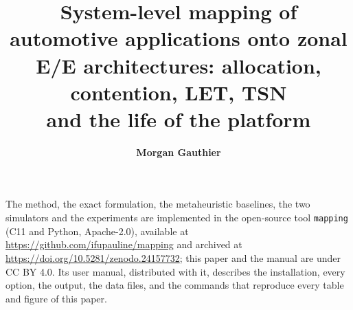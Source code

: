 \documentclass[10pt,a4paper,twocolumn]{article}
\title{System-level mapping of automotive applications onto zonal\\
	E/E architectures: allocation, contention, LET, TSN\\
	and the life of the platform}
\author{\textbf{Morgan Gauthier}}
\date{}
\renewcommand{\paragraph}[1]{\par\smallskip\noindent{\sffamily\bfseries
	\small\color{brand}#1}\hspace{0.5em}}
\theoremstyle{paper}
\theoremstyle{paperremark}
\begin{document}
\twocolumn[{%
\maketitle
\thispagestyle{first}
\begin{tcolorbox}[enhanced,colback=brandlight,colframe=brandlight,arc=1pt,
	boxrule=0pt,left=9pt,right=9pt,top=6pt,bottom=6pt]
\small

\end{tcolorbox}
\vspace{10pt}
}]















\paragraph{Availability.} The method, the exact formulation, the
metaheuristic baselines, the two simulators and the experiments are
implemented in the open-source tool \texttt{mapping} (C11 and Python,
Apache-2.0), available at \url{https://github.com/ifupauline/mapping}
and archived at \url{https://doi.org/10.5281/zenodo.24157732};
this paper and the manual are under CC BY 4.0. Its user manual,
distributed with it, describes the installation, every option, the output,
the data files, and the commands that reproduce every table and figure of
this paper.

\appendix




\end{document}

